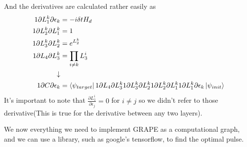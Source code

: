 \documentclass[english, a4paper, 12pt, twoside]{article}
\numberwithin{equation}{section} %
\begin{document}
And the derivatives are calculated rather easily as
\begin{align*}
    1{\partial L_1^k}{\partial \epsilon_k} &= -i \delta t H_d\\
    1{\partial L_2^k}{\partial L_1^k} &= 1 \\
    1{\partial L_3^k}{\partial L_2^k} &= e^{L_2^k} \\
    1{\partial L_4}{\partial L_3^k} &= \prod_{i \ne k} L_3^i \\
    \downarrow \\
    1{\partial C}{\partial \epsilon_k} &= \bra{\psi_{target}}  1{\partial L_4}{\partial L_3^k}  1{\partial L_3^k}{\partial L_2^k} 1{\partial L_2^k}{\partial L_1^k}  1{\partial L_1^k}{\partial \epsilon_k} \ket{\psi_{init}}
\end{align*}
It's important to note that $\frac{\partial L_1^i}{\partial \epsilon_j} = 0$ for $i \ne j$ so we didn't refer to those derivative(This is true for the derivative between any two layers).

We now everything we need to implement GRAPE as a computational graph, and we can use a library, such as google's tensorflow, to find the optimal pulse.

\end{document}
